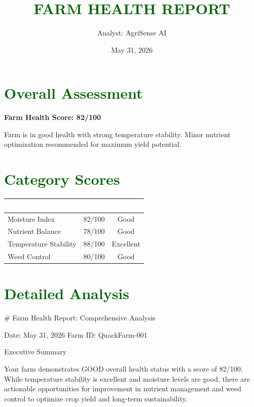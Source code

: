 \documentclass[12pt, a4paper]{article}
\title{\textcolor{darkgreen}{\Large \textbf{FARM HEALTH REPORT}}}
\author{Analyst: AgriSense AI}
\date{May 31, 2026}
\begin{document}
\maketitle

\section*{\textcolor{darkgreen}{Overall Assessment}}

\noindent
\textbf{Farm Health Score: 82/100}

\vspace{0.2cm}

Farm is in good health with strong temperature stability. Minor nutrient optimization recommended for maximum yield potential.

\section*{\textcolor{darkgreen}{Category Scores}}

\begin{center}
\begin{tabular}{|l|c|c|}
\hline
\rowcolor{darkgreen}
\textcolor{white}{\textbf{Category}} & \textcolor{white}{\textbf{Score}} & \textcolor{white}{\textbf{Status}} \\
\hline
Moisture Index & 82/100 & Good \\
Nutrient Balance & 78/100 & Good \\
Temperature Stability & 88/100 & Excellent \\
Weed Control & 80/100 & Good \\
\hline
\end{tabular}
\end{center}

\section*{\textcolor{darkgreen}{Detailed Analysis}}

# Farm Health Report: Comprehensive Analysis

Date: May 31, 2026
Farm ID: QuackFarm-001

 Executive Summary

Your farm demonstrates GOOD overall health status with a score of 82/100. While temperature stability is excellent and moisture levels are good, there are actionable opportunities for improvement in nutrient management and weed control to optimize crop yield and long-term sustainability.
\end{document}
